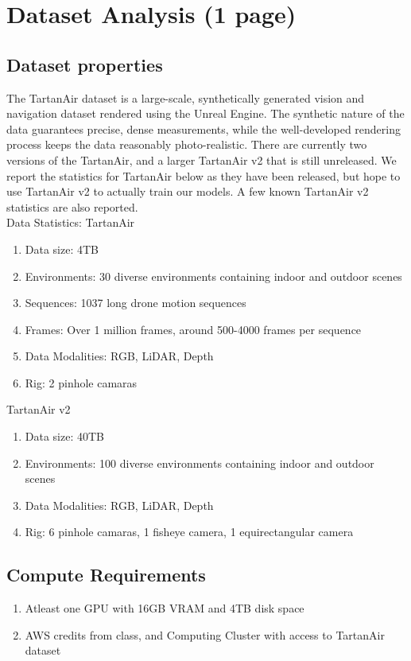 \documentclass[11pt,a4paper]{article}
\begin{document}

\section{Dataset Analysis (1 page)}
\subsection{Dataset properties}
The TartanAir dataset is a large-scale, synthetically generated vision and navigation dataset rendered using the Unreal Engine. The synthetic nature of the data guarantees precise, dense measurements, while the well-developed rendering process keeps the data reasonably photo-realistic. There are currently two versions of the TartanAir, and a larger TartanAir v2 that is still unreleased. We report the statistics for TartanAir below as they have been released, but hope to use TartanAir v2 to actually train our models. A few known TartanAir v2 statistics are also reported. \\

Data Statistics: 
 TartanAir
 \begin{enumerate}
     \item Data size: 4TB 
     \item Environments: 30 diverse environments containing indoor and outdoor scenes
     \item Sequences: 1037 long drone motion sequences
     \item Frames: Over 1 million frames, around 500-4000 frames per sequence
     \item Data Modalities: RGB, LiDAR, Depth
    \item Rig: 2 pinhole camaras

 \end{enumerate}
 TartanAir v2
  \begin{enumerate}
     \item Data size: 40TB 
     \item Environments: 100 diverse environments containing indoor and outdoor scenes
     \item Data Modalities: RGB, LiDAR, Depth
    \item Rig: 6 pinhole camaras, 1 fisheye camera, 1 equirectangular camera
 \end{enumerate}


\subsection{Compute Requirements}
  \begin{enumerate}
    \item Atleast one GPU with 16GB VRAM and 4TB disk space
    \item AWS credits from class, and Computing Cluster with access to TartanAir dataset
    
  \end{enumerate}
\end{document}
